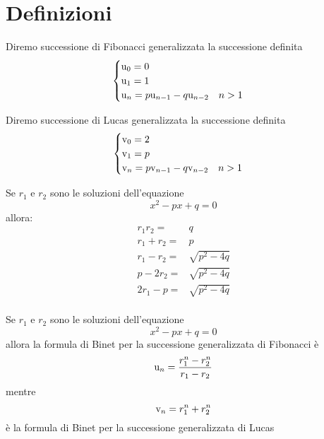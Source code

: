 \section{Definizioni}
\begin{defn}
	Diremo successione di Fibonacci generalizzata la successione definita
	\begin{equation}
		\begin{cases}
			\mathrm{u}_{0}=0\\
			\mathrm{u}_{1}=1\\
			\mathrm{u}_{n}=p\mathrm{u}_{n-1}-q\mathrm{u}_{n-2}\quad n>1\\
		\end{cases}
	\end{equation} 
\end{defn}\cite{Rabinowitz_1996}
\begin{defn}
	Diremo successione di Lucas generalizzata la successione definita
	\begin{equation}
		\begin{cases}
			\mathrm{v}_{0}=2\\
			\mathrm{v}_{1}=p\\
			\mathrm{v}_{n}=p\mathrm{v}_{n-1}-q\mathrm{v}_{n-2}\quad n>1\\
		\end{cases}
	\end{equation}
\end{defn}\cite{Rabinowitz_1996}
\begin{lem}[Proprietà]
	Se $r_{1}$ e $r_{2}$ sono le soluzioni dell'equazione \begin{equation}
		x^2-px+q=0
	\end{equation} allora:
	\begin{align*}
		r_{1}r_{2}=&{}q\\
		r_{1}+r_{2}=&{}p\\
		r_{1}-r_{2}=&{}\sqrt{p^2-4q}\\
		p-2r_{2}=&{}\sqrt{p^2-4q}\\
		2r_{1}-p =&{}\sqrt{p^2-4q}\\
	\end{align*}
\end{lem}  
\begin{thm}\label{thm:FormulaBinetgeneralizzatarr}
	Se $r_{1}$ e $r_{2}$ sono le soluzioni dell'equazione \begin{equation}
		x^2-px+q=0
	\end{equation} allora la formula di Binet per la successione
	generalizzata 
	di Fibonacci è \begin{equation}
		\mathrm{u}_{n}=\dfrac{r_{1}^n-r_{2}^n}{r_{1}-r_{2}}
	\end{equation}
	mentre \begin{equation}
		\mathrm{v}_{n}=r_{1}^n+r_{2}^n
	\end{equation}
	è la formula di Binet per la successione generalizzata di Lucas 
\end{thm}\cite{Rabinowitz_1996}

